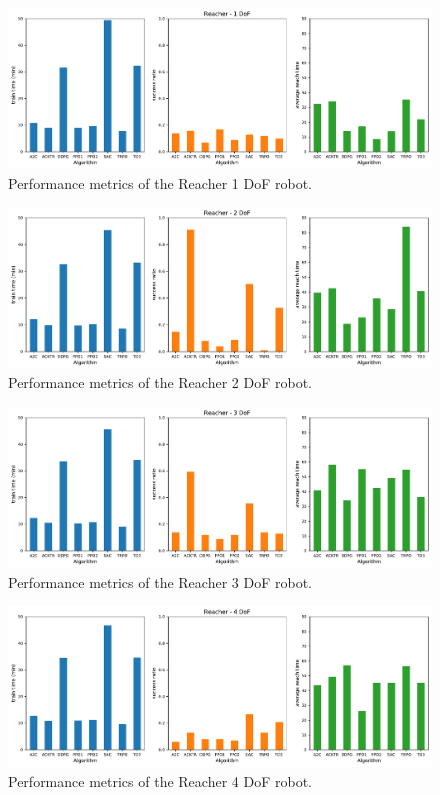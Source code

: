 \documentclass{article}
\begin{document}
\begin{figure}[H]
    \centering
    \includegraphics[width=\textwidth]{../Reacher1Dof-v0/reacher1.pdf}
\caption{Performance metrics of the Reacher 1 DoF robot.}
\end{figure}

\begin{figure}[H]
    \centering
    \includegraphics[width=\textwidth]{../Reacher2Dof-v0/reacher2.pdf}
\caption{Performance metrics of the Reacher 2 DoF robot.}
\end{figure}

\begin{figure}[H]
    \centering
    \includegraphics[width=\textwidth]{../Reacher3Dof-v0/reacher3.pdf}
\caption{Performance metrics of the Reacher 3 DoF robot.}
\end{figure}

\begin{figure}[H]
    \centering
    \includegraphics[width=\textwidth]{../Reacher4Dof-v0/reacher4.pdf}
\caption{Performance metrics of the Reacher 4 DoF robot.}
\end{figure}
\end{document}
